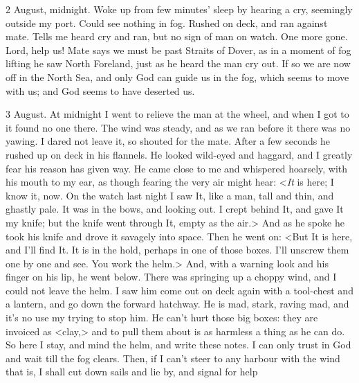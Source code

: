\begin{diary}{2 August, midnight.}
Woke up from few minutes' sleep by hearing a cry, seemingly outside my port. Could see nothing in fog. Rushed on deck, and ran against mate. Tells me heard cry and ran, but no sign of man on watch. One more gone. Lord, help us! Mate says we must be past Straits of Dover, as in a moment of fog lifting he saw North Foreland, just as he heard the man cry out. If so we are now off in the North Sea, and only God can guide us in the fog, which seems to move with us; and God seems to have deserted us.
\end{diary}
 
\begin{diary}{3 August.}
At midnight I went to relieve the man at the wheel, and when I got to it found no one there. The wind was steady, and as we ran before it there was no yawing. I dared not leave it, so shouted for the mate. After a few seconds he rushed up on deck in his flannels. He looked wild-eyed and haggard, and I greatly fear his reason has given way. He came close to me and whispered hoarsely, with his mouth to my ear, as though fearing the very air might hear: <\textit{It} is here; I know it, now. On the watch last night I saw It, like a man, tall and thin, and ghastly pale. It was in the bows, and looking out. I crept behind It, and gave It my knife; but the knife went through It, empty as the air.> And as he spoke he took his knife and drove it savagely into space. Then he went on: <But It is here, and I'll find It. It is in the hold, perhaps in one of those boxes. I'll unscrew them one by one and see. You work the helm.> And, with a warning look and his finger on his lip, he went below. There was springing up a choppy wind, and I could not leave the helm. I saw him come out on deck again with a tool-chest and a lantern, and go down the forward hatchway. He is mad, stark, raving mad, and it's no use my trying to stop him. He can't hurt those big boxes: they are invoiced as <clay,> and to pull them about is as harmless a thing as he can do. So here I stay, and mind the helm, and write these notes. I can only trust in God and wait till the fog clears. Then, if I can't steer to any harbour with the wind that is, I shall cut down sails and lie by, and signal for help


\end{diary}
